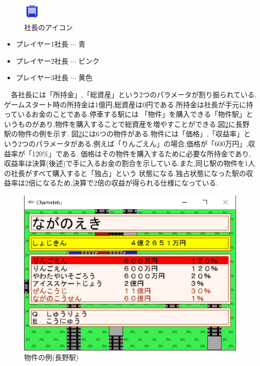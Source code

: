 \documentclass[a4j]{jarticle}
\begin{document}
    \begin{figure}[H]
        \centering
        \includegraphics[scale=3.0]{player1.png}
        \caption{社長のアイコン}
         \label{iconshachou}
        \end{figure}
    
    \begin{itemize}
        \item プレイヤー1社長 $\cdots$ 青
        \item プレイヤー2社長 $\cdots$ ピンク
        \item プレイヤー3社長 $\cdots$ 黄色
      \end{itemize}
      　各社長には「所持金」,「総資産」という2つのパラメータが割り振られている.ゲームスタート時の所持金は1億円,総資産は0円である.所持金は社長が手元に持っているお金のことである.停車する駅には
      「物件」を購入できる「物件駅」というものがあり,物件を購入することで総資産を増やすことができる.図\ref{bukkenex}に長野駅の物件の例を示す.
      図\ref{bukkenex}には6つの物件がある.物件には「価格」,「収益率」という2つのパラメータがある.例えば「りんごえん」の場合,価格が「600万円」,収益率が「120\%」である.
      価格はその物件を購入するために必要な所持金であり,収益率は決算(後述)で手に入るお金の割合を示している.また,同じ駅の物件を1人の社長がすべて購入すると「独占」という
      状態になる.独占状態になった駅の収益率は2倍になるため,決算で2倍の収益が得られる仕様になっている.

      \begin{figure}[H]
        \centering
        \includegraphics[scale=1.5]{bukkenex.eps}
        \caption{物件の例(長野駅)}
         \label{bukkenex}
        \end{figure}
    
\end{document}
